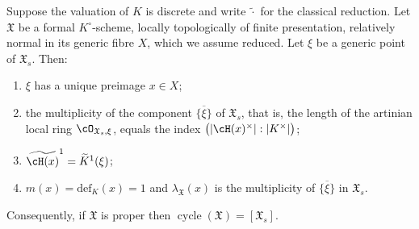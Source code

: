 \begin{proposition}
\label{prop:ch17-defect-dvr}
Suppose the valuation of $K$ is discrete and write $\widetilde\cdot$ for
the classical reduction.  Let $\mathfrak X$ be a formal
$K^\circ$-scheme, locally topologically of finite presentation, relatively
normal in its generic fibre $X$, which we assume reduced.  Let $\xi$ be
a generic point of $\mathfrak X_s$.  Then:
\begin{enumerate}
\item\label{itm:ch17-dvr:unique}
 $\xi$ has a unique preimage $x\in X$;
\item\label{itm:ch17-dvr:mult}
 the multiplicity of the component $\overline{\{\xi\}}$ of
 $\mathfrak X_s$, that is, the length of the artinian local ring
 $\cO_{\mathfrak X_s,\xi}$, equals the index
 $\bigl(|\cH(x)^\times|:|K^\times|\bigr)$;
\item\label{itm:ch17-dvr:residue}
 $\widetilde{\cH(x)}^1=\widetilde K^1(\xi)$;
\item\label{itm:ch17-dvr:defect}
 $m(x)=\mathrm{def}_K(x)=1$ and $\lambda_{\mathfrak X}(x)$ is the
 multiplicity of $\overline{\{\xi\}}$ in $\mathfrak X_s$.
\end{enumerate}
Consequently, if $\mathfrak X$ is proper then
$\operatorname{cycle}(\mathfrak X)=[\mathfrak X_s]$.
\end{proposition}

